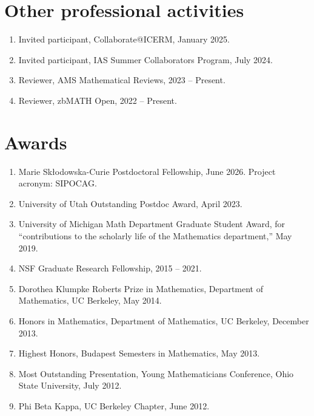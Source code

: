 \documentclass{res}
\begin{document}
\begin{resume}
\section{Other professional activities}
\begin{enumerate}
\item Invited participant, Collaborate@ICERM, January 2025.
\item Invited participant, IAS Summer Collaborators Program, July 2024.
\item Reviewer, AMS Mathematical Reviews, 2023 -- Present.
\item Reviewer, zbMATH Open, 2022 -- Present.
\end{enumerate}

\section{Awards}
\begin{enumerate}
\item Marie Sk\l odowska-Curie Postdoctoral Fellowship, June 2026. Project acronym: SIPOCAG.
\item University of Utah Outstanding Postdoc Award, April 2023.
\item University of Michigan Math Department Graduate Student Award, for ``contributions to the scholarly life of the Mathematics department,'' May 2019.
\item NSF Graduate Research Fellowship, 2015 -- 2021.
\item Dorothea Klumpke Roberts Prize in Mathematics, Department of Mathematics, UC Berkeley, May 2014.
\item Honors in Mathematics, Department of Mathematics, UC Berkeley, December 2013.
\item Highest Honors, Budapest Semesters in Mathematics, May 2013.
\item Most Outstanding Presentation, Young Mathematicians Conference, Ohio State University, July 2012.
\item Phi Beta Kappa, UC Berkeley Chapter, June 2012.
\end{enumerate}



\end{resume}
\end{document}
